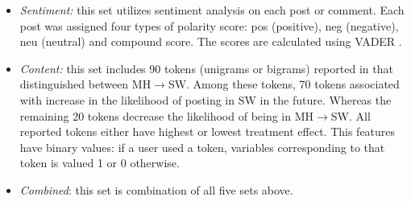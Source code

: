 \begin{itemize}
\item \textit{Sentiment:} this set utilizes sentiment analysis on each post or comment. Each post was assigned four types of polarity score: pos (positive), neg (negative), neu (neutral) and compound score. The scores are calculated using VADER \cite{Hutto2014}.
\item \textit{Content:} this set includes 90 tokens (unigrams or bigrams) reported in \cite{DeChoudhury2016} that distinguished between MH$\rightarrow$SW. Among these tokens, 70 tokens associated with increase in the likelihood of posting in SW in the future. Whereas the remaining 20 tokens decrease the likelihood of being in MH$\rightarrow$SW. All reported tokens either have highest or lowest treatment effect. This features have binary values:  if a user used a token, variables corresponding to that token is valued 1 or 0 otherwise.
\item \textit{Combined}: this set is combination of all five sets above.
\end{itemize}
